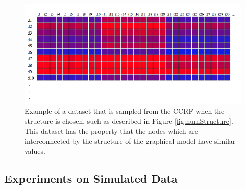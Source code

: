 \begin{figure}
\begin{center}
\includegraphics[scale=0.5]{numeric_sample.png}
\end{center}
\caption{Example of a dataset that is sampled from the CCRF when the structure is chosen, such as described in Figure \ref{fig:numStructure}. This dataset has the property that the nodes which are interconnected by the structure of the graphical model have similar values.}
\label{fig:numSample}
\end{figure}

\subsection{Experiments on Simulated Data}
